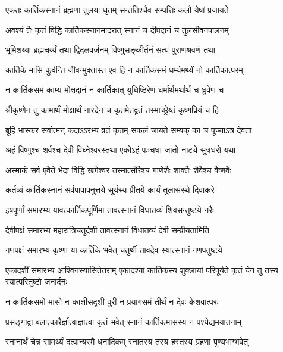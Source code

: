 \twolineshloka
{एकतः कार्तिकस्नानं ब्रह्मणा तुलया धृतम्}
{सन्ततिश्चैव सम्पत्तिः कलौ येषां प्रजायते} %

\twolineshloka
{अवश्यं तैः कृतं विद्धि कार्तिकस्नानमादरात्}
{स्नानं च दीपदानं च तुलसीवनपालनम्} %

\twolineshloka
{भूमिशय्या ब्रह्मचर्य्यं तथा द्विदलवर्जनम्}
{विष्णुसङ्कीर्तनं सत्यं पुराणश्रवणं तथा} %

\twolineshloka
{कार्तिके मासि कुर्वन्ति जीवन्मुक्तास्त एव हि}
{न कार्तिकसमं धर्म्यमर्थ्यं नो कार्तिकात्परम्} %

\twolineshloka
{न कार्तिकसमं काम्यं मोक्षदानं न कार्तिकात्}
{युधिष्ठिरेण धर्मार्थमर्थार्थं च ध्रुवेण च} %

\twolineshloka
{श्रीकृष्णेन तु कामार्थं मोक्षार्थं नारदेन च}
{कृतमेतद्व्रतं तस्माच्छ्रेष्ठं कृष्णप्रियं च हि} %


\twolineshloka
{ब्रूहि भास्कर सर्वात्मन् कदाऽऽरभ्य व्रतं कृतम्}
{सफलं जायते सम्यक् का च पूज्याऽत्र देवता} %


\twolineshloka
{अहं विष्णुश्च शर्वश्च देवी विघ्नेश्वरस्तथा}
{एकोऽहं पञ्चधा जातो नाट्ये सूत्रधरो यथा} %

\twolineshloka
{अस्माकं सर्व एवैते भेदा विद्धि खगेश्वर}
{तस्मात्सौरैश्च गाणेशैः शाक्तैः शैवैश्च वैष्णवैः} %

\twolineshloka
{कर्तव्यं कार्तिकस्नानं सर्वपापापनुत्तये}
{सूर्यस्य प्रीतये कार्यं तुलासंस्थे दिवाकरे} %

\twolineshloka
{इषपूर्णां समारभ्य यावत्कार्तिकपूर्णिमा}
{तावत्स्नानं विधातव्यं शिवसन्तुष्टये नरैः} %

\twolineshloka
{देवीपक्षं समारभ्य महारात्रिचतुर्दशी}
{तावत्स्नानं विधातव्यं देवी सम्प्रीयतामिति} %

\twolineshloka
{गणपक्षं समारभ्य कृष्णा या कार्तिके भवेत्}
{चतुर्थी तावदेव स्यात्स्नानं गणपतुष्टये} %

\threelineshloka
{एकादशीं समारभ्य आश्विनस्यासितेतराम्}
{एकादश्यां कार्तिकस्य शुक्लायां परिपूर्यते}
{कृतं येन तु तस्य स्यात्परितुष्टो जनार्दनः} %

\twolineshloka
{न कार्तिकसमो मासो न काशीसदृशी पुरी}
{न प्रयागसमं तीर्थं न देवः केशवात्परः} %

\twolineshloka
{प्रसङ्गाद्वा बलात्कारैर्ज्ञात्वाज्ञात्वा कृतं भवेत्}
{स्नानं कार्तिकमासस्य न पश्येद्यमयातनाम्} %

\twolineshloka
{स्नानार्थं चेन्न सामर्थ्यं दत्वान्यस्मै धनादिकम्}
{स्नातस्य तस्य हस्तस्य ग्रहणा पुण्यभाग्भवेत्} %

